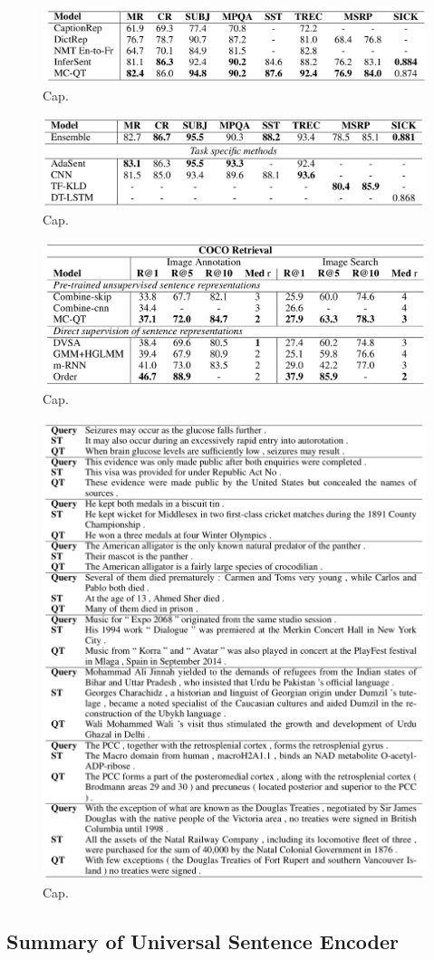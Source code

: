 \begin{figure}
\centering
  \includegraphics[width=.5\linewidth]{files/quickthoughts-3.png}
  \caption{Cap.}
  \label{fig:vae}
\end{figure}

\begin{figure}
\centering
  \includegraphics[width=.5\linewidth]{files/quickthoughts-4.png}
  \caption{Cap.}
  \label{fig:vae}
\end{figure}

\begin{figure}
\centering
  \includegraphics[width=.5\linewidth]{files/quickthoughts-5.png}
  \caption{Cap.}
  \label{fig:vae}
\end{figure}

\begin{figure}
\centering
  \includegraphics[width=.5\linewidth]{files/quickthoughts-6.png}
  \caption{Cap.}
  \label{fig:vae}
\end{figure}

\subsection{Summary of Universal Sentence Encoder}

